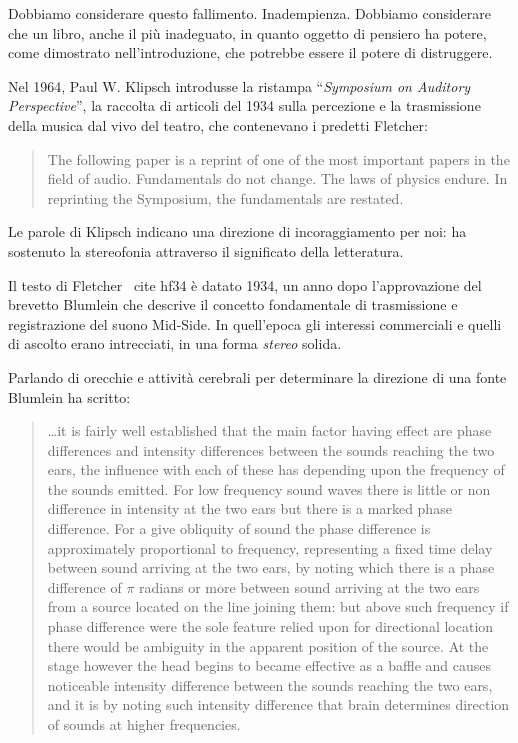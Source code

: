 Dobbiamo considerare questo fallimento. Inadempienza. Dobbiamo considerare che
un libro, anche il più inadeguato, in quanto oggetto di pensiero ha potere, come
dimostrato nell'introduzione, che potrebbe essere il potere di distruggere.

Nel 1964, Paul W. Klipsch introdusse la ristampa “\emph{Symposium on Auditory
Perspective}”, la raccolta di articoli del 1934 sulla percezione e la
trasmissione della musica dal vivo del teatro, che contenevano i predetti
Fletcher:

\begin{quotation}
The following paper is a reprint of one of the most important papers in the
field of audio. Fundamentals do not change. The laws of physics endure. In
reprinting the Symposium, the fundamentals are restated. \cite{sap1964}
\end{quotation}

Le parole di Klipsch indicano una direzione di incoraggiamento per noi: ha
sostenuto la stereofonia attraverso il significato della letteratura.

Il testo di Fletcher \ cite {hf34} è datato 1934, un anno dopo l'approvazione
del brevetto Blumlein che descrive il concetto fondamentale di trasmissione e
registrazione del suono Mid-Side. In quell'epoca gli interessi commerciali e
quelli di ascolto erano intrecciati, in una forma \emph{stereo} solida.

Parlando di orecchie e attività cerebrali per determinare la direzione di una
fonte Blumlein ha scritto:

\begin{quotation}
…it is fairly well established that the main factor having effect are phase
differences and intensity differences between the sounds reaching the two ears,
the influence with each of these has depending upon the frequency of the sounds
emitted. For low frequency sound waves there is little or non difference in
intensity at the two ears but there is a marked phase difference. For a give
obliquity of sound the phase difference is approximately proportional to
frequency, representing a fixed time delay between sound arriving at the two
ears, by noting which there is a phase difference of $\pi$ radians or more
between sound arriving at the two ears from a source located on the line joining
them: but above such frequency if phase difference were the sole feature relied
upon for directional location there would be ambiguity in the apparent position
of the source. At the stage however the head begins to became effective as a
baffle and causes noticeable intensity difference between the sounds reaching
the two ears, and it is by noting such intensity difference that brain
determines direction of sounds at higher frequencies. \cite{ab58}
\end{quotation}

